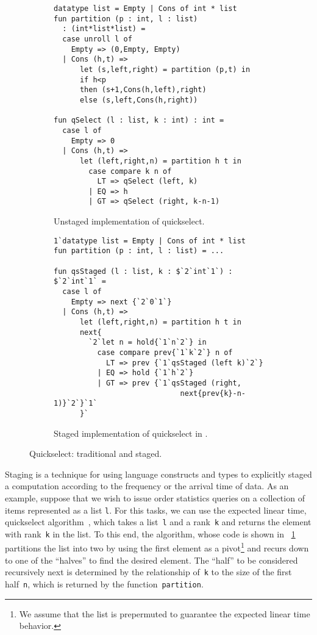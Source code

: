 \begin{figure*}
\begin{subfigure}{0.5\textwidth}
\begin{lstlisting} 
datatype list = Empty | Cons of int * list
fun partition (p : int, l : list) 
  : (int*list*list) =
  case unroll l of 
    Empty => (0,Empty, Empty) 
  | Cons (h,t) =>
      let (s,left,right) = partition (p,t) in
      if h<p 
      then (s+1,Cons(h,left),right)
      else (s,left,Cons(h,right))

fun qSelect (l : list, k : int) : int = 
  case l of
    Empty => 0
  | Cons (h,t) => 
      let (left,right,n) = partition h t in
        case compare k n of
          LT => qSelect (left, k)
        | EQ => h
        | GT => qSelect (right, k-n-1)
\end{lstlisting}
\caption{Unstaged implementation of quickselect.}
\label{fig:quickselect}
\label{fig:qs-unstaged}
\end{subfigure}%
\begin{subfigure}{0.5\textwidth}
\begin{lstlisting} 
1`datatype list = Empty | Cons of int * list
fun partition (p : int, l : list) = ...

fun qsStaged (l : list, k : $`2`int`1`) : $`2`int`1` = 
  case l of
    Empty => next {`2`0`1`}
  | Cons (h,t) => 
      let (left,right,n) = partition h t in
      next{
        `2`let n = hold{`1`n`2`} in
          case compare prev{`1`k`2`} n of
            LT => prev {`1`qsStaged (left k)`2`}
          | EQ => hold {`1`h`2`}
          | GT => prev {`1`qsStaged (right, 
                             next{prev{k}-n-1)}`2`}`1`
      }`
\end{lstlisting}
\caption{Staged implementation of quickselect in \lang.}
\label{fig:qsstaged}
\label{fig:qs-staged}
\end{subfigure}
\caption{Quickselect: traditional and staged.}
\end{figure*}


Staging is a technique for using language constructs and types to
explicitly staged a computation according to the frequency or the
arrival time of data.  As an example, suppose that we wish to issue
order statistics queries on a collection of items represented as a
list \texttt{l}.  For this tasks, we can use the expected linear time,
quickselect algorithm~\cite{quickselect}, which takes a
list~\texttt{l} and a rank~\texttt{k} and returns the element with
rank~\texttt{k} in the list.  To this end, the algorithm, whose code
is shown in ~\ref{fig:qs-unstaged} partitions the list into two by
using the first element as a pivot\footnote{We assume that the list
  is prepermuted to guarantee the expected linear time behavior.} and
recurs down to one of the ``halves'' to find the desired element.  The
``half'' to be considered recursively next is determined by the
relationship of~\texttt{k} to the size of the first half~\texttt{n},
which is returned by the function~\texttt{partition}.

